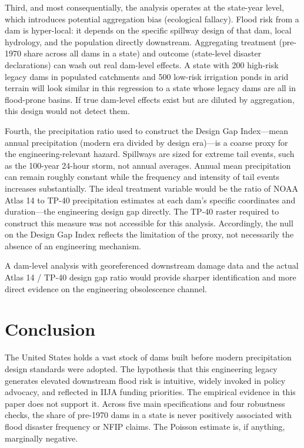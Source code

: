 \documentclass[12pt]{article}
\begin{document}
Third, and most consequentially, the analysis operates at the state-year level, which introduces potential aggregation bias (ecological fallacy). Flood risk from a dam is hyper-local: it depends on the specific spillway design of that dam, local hydrology, and the population directly downstream. Aggregating treatment (pre-1970 share across all dams in a state) and outcome (state-level disaster declarations) can wash out real dam-level effects. A state with 200 high-risk legacy dams in populated catchments and 500 low-risk irrigation ponds in arid terrain will look similar in this regression to a state whose legacy dams are all in flood-prone basins. If true dam-level effects exist but are diluted by aggregation, this design would not detect them.

Fourth, the precipitation ratio used to construct the Design Gap Index---mean annual precipitation (modern era divided by design era)---is a coarse proxy for the engineering-relevant hazard. Spillways are sized for extreme tail events, such as the 100-year 24-hour storm, not annual averages. Annual mean precipitation can remain roughly constant while the frequency and intensity of tail events increases substantially. The ideal treatment variable would be the ratio of NOAA Atlas 14 to TP-40 precipitation estimates at each dam's specific coordinates and duration---the engineering design gap directly. The TP-40 raster required to construct this measure was not accessible for this analysis. Accordingly, the null on the Design Gap Index reflects the limitation of the proxy, not necessarily the absence of an engineering mechanism.

A dam-level analysis with georeferenced downstream damage data and the actual Atlas 14 / TP-40 design gap ratio would provide sharper identification and more direct evidence on the engineering obsolescence channel.

\section{Conclusion}

The United States holds a vast stock of dams built before modern precipitation design standards were adopted. The hypothesis that this engineering legacy generates elevated downstream flood risk is intuitive, widely invoked in policy advocacy, and reflected in IIJA funding priorities. The empirical evidence in this paper does not support it. Across five main specifications and four robustness checks, the share of pre-1970 dams in a state is never positively associated with flood disaster frequency or NFIP claims. The Poisson estimate is, if anything, marginally negative.
\end{document}

